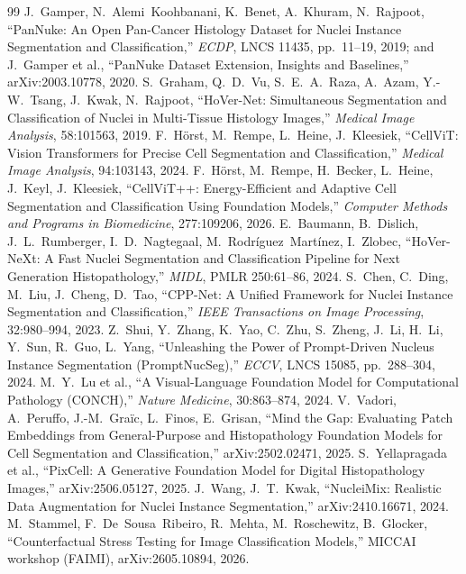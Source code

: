 \documentclass[11pt]{article}
\begin{document}
\begin{thebibliography}{99}\small
{} J.~Gamper, N.~Alemi~Koohbanani, K.~Benet, A.~Khuram, N.~Rajpoot,
``PanNuke: An Open Pan-Cancer Histology Dataset for Nuclei Instance Segmentation and
Classification,'' \emph{ECDP}, LNCS 11435, pp.~11--19, 2019; and J.~Gamper et al., ``PanNuke
Dataset Extension, Insights and Baselines,'' arXiv:2003.10778, 2020.
 S.~Graham, Q.~D.~Vu, S.~E.~A.~Raza, A.~Azam, Y.-W.~Tsang,
J.~Kwak, N.~Rajpoot, ``HoVer-Net: Simultaneous Segmentation and Classification of Nuclei in
Multi-Tissue Histology Images,'' \emph{Medical Image Analysis}, 58:101563, 2019.
 F.~H\"orst, M.~Rempe, L.~Heine, J.~Kleesiek, ``CellViT: Vision
Transformers for Precise Cell Segmentation and Classification,'' \emph{Medical Image Analysis},
94:103143, 2024.
 F.~H\"orst, M.~Rempe, H.~Becker, L.~Heine, J.~Keyl, J.~Kleesiek,
``CellViT++: Energy-Efficient and Adaptive Cell Segmentation and Classification Using
Foundation Models,'' \emph{Computer Methods and Programs in Biomedicine}, 277:109206, 2026.
 E.~Baumann, B.~Dislich, J.~L.~Rumberger, I.~D.~Nagtegaal,
M.~Rodr\'iguez~Mart\'inez, I.~Zlobec, ``HoVer-NeXt: A Fast Nuclei Segmentation and
Classification Pipeline for Next Generation Histopathology,'' \emph{MIDL}, PMLR 250:61--86,
2024.
 S.~Chen, C.~Ding, M.~Liu, J.~Cheng, D.~Tao, ``CPP-Net: A Unified Framework for
Nuclei Instance Segmentation and Classification,'' \emph{IEEE Transactions on Image Processing},
32:980--994, 2023.
 Z.~Shui, Y.~Zhang, K.~Yao, C.~Zhu, S.~Zheng, J.~Li, H.~Li, Y.~Sun,
R.~Guo, L.~Yang, ``Unleashing the Power of Prompt-Driven Nucleus Instance Segmentation
(PromptNucSeg),'' \emph{ECCV}, LNCS 15085, pp.~288--304, 2024.
 M.~Y.~Lu et al., ``A Visual-Language Foundation Model for Computational
Pathology (CONCH),'' \emph{Nature Medicine}, 30:863--874, 2024.
 V.~Vadori, A.~Peruffo, J.-M.~Gra\"ic, L.~Finos, E.~Grisan, ``Mind the Gap:
Evaluating Patch Embeddings from General-Purpose and Histopathology Foundation Models for Cell
Segmentation and Classification,'' arXiv:2502.02471, 2025.
 S.~Yellapragada et al., ``PixCell: A Generative Foundation Model for
Digital Histopathology Images,'' arXiv:2506.05127, 2025.
 J.~Wang, J.~T.~Kwak, ``NucleiMix: Realistic Data Augmentation for Nuclei
Instance Segmentation,'' arXiv:2410.16671, 2024.
 M.~Stammel, F.~De~Sousa~Ribeiro, R.~Mehta, M.~Roschewitz, B.~Glocker,
``Counterfactual Stress Testing for Image Classification Models,'' MICCAI workshop (FAIMI),
arXiv:2605.10894, 2026.
\end{thebibliography}
\end{document}
